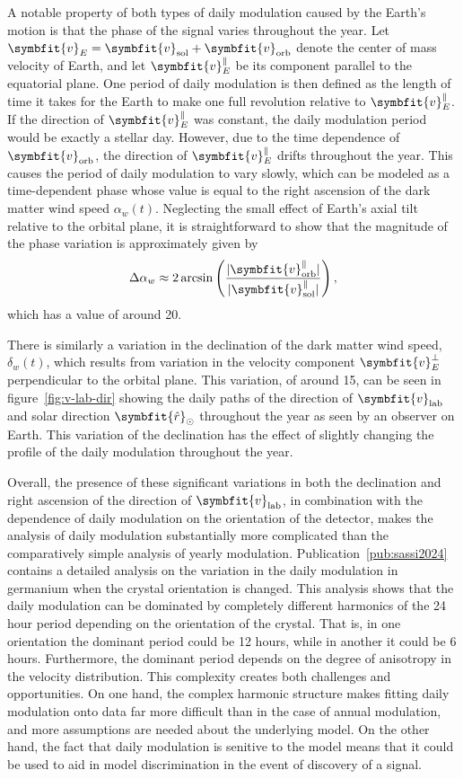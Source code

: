 \documentclass[b5paper, 10pt, twoside]{book}
\renewcommand{\vec}[1]{\symbfit{#1}}
\newcommand{\unitv}[1]{\symbfit{\hat{#1}}}
\begin{document}
A notable property of both types of daily modulation caused by the Earth's motion is that the phase of the signal varies throughout the year. Let $\vec{v}_E=\vec{v}_\text{sol}+\vec{v}_\text{orb}$ denote the center of mass velocity of Earth, and let $\vec{v}_E^\parallel$ be its component parallel to the equatorial plane. One period of daily modulation is then defined as the length of time it takes for the Earth to make one full revolution relative to $\vec{v}_E^\parallel$. If the direction of $\vec{v}_E^\parallel$ was constant, the daily modulation period would be exactly a stellar day. However, due to the time dependence of $\vec{v}_\text{orb}$, the direction of $\vec{v}_E^\parallel$ drifts throughout the year. This causes the period of daily modulation to vary slowly, which can be modeled as a time-dependent phase whose value is equal to the right ascension of the dark matter wind speed $\alpha_w(t)$. Neglecting the small effect of Earth's axial tilt relative to the orbital plane, it is straightforward to show that the magnitude of the phase variation is approximately given by
\begin{equation}
    \Delta\alpha_w\approx 2\arcsin\left(\frac{|\vec{v}_\text{orb}^\parallel|}{|\vec{v}_\text{sol}^\parallel|}\right),
\end{equation}
which has a value of around 20\degree.

There is similarly a variation in the declination of the dark matter wind speed, $\delta_w(t)$, which results from variation in the velocity component $\vec{v}_E^\perp$ perpendicular to the orbital plane. This variation, of around 15\degree{}, can be seen in figure~\ref{fig:v-lab-dir} showing the daily paths of the direction of $\vec{v}_\text{lab}$ and solar direction $\unitv{r}_\odot$ throughout the year as seen by an observer on Earth. This variation of the declination has the effect of slightly changing the profile of the daily modulation throughout the year.

Overall, the presence of these significant variations in both the declination and right ascension of the direction of $\vec{v}_\text{lab}$, in combination with the dependence of daily modulation on the orientation of the detector, makes the analysis of daily modulation substantially more complicated than the comparatively simple analysis of yearly modulation. Publication~\ref{pub:sassi2024} contains a detailed analysis on the variation in the daily modulation in germanium when the crystal orientation is changed. This analysis shows that the daily modulation can be dominated by completely different harmonics of the 24 hour period depending on the orientation of the crystal. That is, in one orientation the dominant period could be 12 hours, while in another it could be 6 hours. Furthermore, the dominant period depends on the degree of anisotropy in the velocity distribution. This complexity creates both challenges and opportunities. On one hand, the complex harmonic structure makes fitting daily modulation onto data far more difficult than in the case of annual modulation, and more assumptions are needed about the underlying model. On the other hand, the fact that daily modulation is senitive to the model means that it could be used to aid in model discrimination in the event of discovery of a signal.
\end{document}
